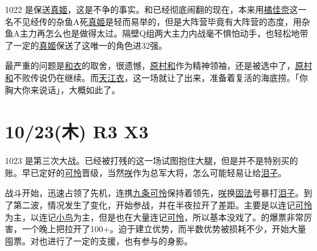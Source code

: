 1022 是保送\uline{真姬}，这是不争的事实。和已经彻底闹翻的现在，本来用\uline{橘佳奈}这一名不见经传的杂鱼A死\uline{真姬}是轻而易举的，但是大阵营毕竟有大阵营的态度，用杂鱼A主力再怎么也是做得太过。隔壁Q组两大主力内战毫不惧怕动手，也轻松地带了一定的\uline{真姬}保送了这唯一的角色进32强。

最严重的问题是\uline{和}\uline{衣}的取舍，很遗憾，\uline{原村和}作为精神领袖，还是被选中了，\uline{原村和}不败传说仍在继续。而\uline{天江衣}，这一场就让了出来，准备着复活的海底捞。「你胸大你来说话」，大概如此了。

\section{10/23(木) R3 X3}


1023 是第三次大战。已经被打残的这一场试图抱住大腿，但是并不是特别买的账。早已定好的\uline{可怜}晋级，当然\uline{咲}作为总军大将，怎么可能轻易让给\uline{泪子}。

战斗开始，迅速占领了先机，连携\uline{九条可怜}保持着领先，\uline{咲}换\uline{固法}号暴打\uline{泪子}。到了第二波，情况发生了变化，开始参战，并在半夜拉开了差距。主要是以连记\uline{可怜}为主，以连记\uline{小鸟}为主，但是也在大量连记\uline{可怜}，所以基本没戏了。的爆票非常厉害，一个晚上把拉开了100+。迫于建立优势，而半数优势被损耗不少，开始大量囤票。对也进行了一定的支援，也有参与的身影。

